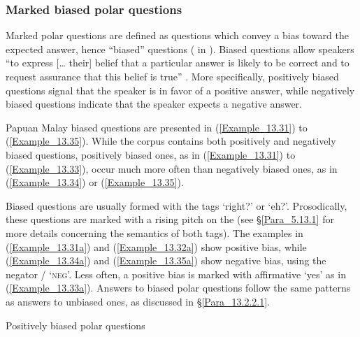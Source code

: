 \subsubsection[Marked biased polar questions]{Marked biased polar questions}
\label{Para_13.2.2.2}
Marked polar questions are defined as questions which convey a bias toward the expected answer, hence “biased” questions (\citealt{Moravcsik.1971} in \citealt[180]{Sadock.1985}). Biased questions allow speakers “to express [{\ldots} their] belief that a particular answer is likely to be correct and to request assurance that this belief is true”  \citep[180]{Sadock.1985}. More specifically, positively biased questions signal that the speaker is in favor of a positive answer, while negatively biased questions indicate that the speaker expects a negative answer. 



Papuan Malay biased questions are presented in (\ref{Example_13.31}) to (\ref{Example_13.35}). While the corpus contains both positively and negatively biased questions, positively biased ones, as in (\ref{Example_13.31}) to (\ref{Example_13.33}), occur much more often than negatively biased ones, as in (\ref{Example_13.34}) or (\ref{Example_13.35}).



Biased questions are usually formed with the tags  ‘right?’ or  ‘eh?’. Prosodically, these questions are marked with a rising pitch on the  (see §\ref{Para_5.13.1} for more details concerning the semantics of both tags). The examples in (\ref{Example_13.31a}) and (\ref{Example_13.32a}) show positive bias, while (\ref{Example_13.34a}) and (\ref{Example_13.35a}) show negative bias, using the negator / ‘\textsc{neg}’. Less often, a positive bias is marked with affirmative  ‘yes’ as in (\ref{Example_13.33a}). Answers to biased polar questions follow the same patterns as answers to unbiased ones, as discussed in §\ref{Para_13.2.2.1}.

\largerpage[2]
\begin{styleExampleTitle}
Positively biased polar questions
\end{styleExampleTitle}

